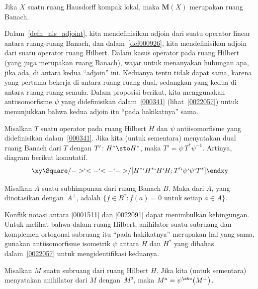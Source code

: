 \begin{cor} Jika $X$ suatu ruang Hausdorff kompak lokal, maka $\textbf{M}(X)$
merupakan ruang Banach.
\end{cor}










Dalam~\ref{defn_nls_adjoint}, kita mendefinisikan adjoin dari suatu operator linear antara ruang-ruang Banach,
dan dalam~\ref{def000926}, kita mendefinisikan adjoin dari suatu operator ruang Hilbert.
Dalam kasus operator pada ruang Hilbert (yang juga merupakan ruang Banach),
wajar untuk menanyakan hubungan apa, jika ada, di antara kedua ``adjoin'' ini.
Keduanya tentu tidak dapat sama, karena yang pertama bekerja di antara ruang-ruang dual, sedangkan yang kedua
di antara ruang-ruang semula. Dalam proposisi berikut, kita menggunakan antiisomorfisme
$\psi$ yang didefinisikan dalam~\ref{000341} (lihat~\ref{0022057}) untuk menunjukkan bahwa kedua adjoin itu
``pada hakikatnya'' sama.

\begin{prop} Misalkan $T$ suatu operator pada ruang Hilbert $H$ dan $\psi$ antiisomorfisme yang
didefinisikan dalam~\ref{000341}. Jika kita (untuk sementara) menyatakan dual ruang Banach
dari $T$ dengan $T'\colon H^* \sto H^*$, maka $T' = \psi\, T^* \psi^{-1}$. Artinya,
diagram berikut komutatif.
   \[ \xy
          \Square/{->}`{<-}`{<-}`{->}/[H^*`H^*`H`H;T'`\psi`\psi`T^*]
      \endxy \]
\end{prop}

\begin{defn}\label{0022091} Misalkan $A$ suatu subhimpunan dari ruang Banach $B$. Maka
 dari $A$, yang dinotasikan
dengan~$A^\perp$, adalah $\{f \in B^*\colon f(a) = 0 \text{ untuk setiap $a \in A$}\}$.
\end{defn}

Konflik notasi antara \ref{0001511} dan \ref{0022091} dapat
menimbulkan kebingungan. Untuk melihat bahwa dalam ruang Hilbert, anihilator suatu subruang dan
komplemen ortogonal subruang itu ``pada hakikatnya'' merupakan hal yang sama, gunakan
antiisomorfisme isometrik $\psi$ antara $H$ dan $H^*$ yang dibahas dalam~\ref{0022057} untuk mengidentifikasi keduanya.

\begin{prop} Misalkan $M$ suatu subruang dari ruang Hilbert $H$. Jika kita (untuk sementara) menyatakan
anihilator dari $M$ dengan~$M^a$, maka $M^a = \psi^{\sto}\bigl(M^\perp\bigr)$.
\end{prop}
